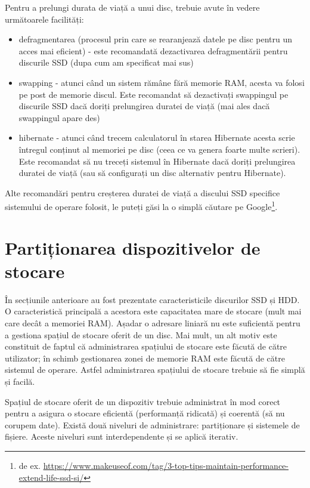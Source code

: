 Pentru a prelungi durata de viață a unui disc, trebuie avute în vedere următoarele facilități:

\begin{itemize}
  \item defragmentarea (procesul prin care se rearanjează datele pe disc pentru un acces mai eficient) - este recomandată dezactivarea defragmentării pentru discurile SSD (dupa cum am specificat mai sus)
  \item swapping - atunci când un sistem rămâne fără memorie RAM, acesta va folosi pe post de memorie discul.
Este recomandat să dezactivați swappingul pe discurile SSD dacă doriți prelungirea duratei de viață (mai ales dacă swappingul apare des)
  \item hibernate - atunci când trecem calculatorul în starea Hibernate acesta scrie întregul conținut al memoriei pe disc (ceea ce va genera foarte multe scrieri).
Este recomandat să nu treceți sistemul în Hibernate dacă doriți prelungirea duratei de viață (sau să configurați un disc alternativ pentru Hibernate).
\end{itemize}

Alte recomandări pentru creșterea duratei de viață a discului SSD specifice sistemului de operare folosit, le puteți găsi la o simplă căutare pe Google\footnote{de ex. \url{https://www.makeuseof.com/tag/3-top-tips-maintain-performance-extend-life-ssd-si/}}.

\section{Partiționarea dispozitivelor de stocare}
\label{sec:storage:partition}

În secțiunile anterioare au fost prezentate caracteristicile discurilor SSD și HDD.
O caracteristică principală a acestora este capacitatea mare de stocare (mult mai care decât a memoriei RAM).
Așadar o adresare liniară nu este suficientă pentru a gestiona spațiul de stocare oferit de un disc.
Mai mult, un alt motiv este constituit de faptul că administrarea spațiului de stocare este făcută de către utilizator;
în schimb gestionarea zonei de memorie RAM este făcută de către sistemul de operare.
Astfel administrarea spațiului de stocare trebuie să fie simplă și facilă.

Spațiul de stocare oferit de un dispozitiv trebuie administrat în mod corect pentru a asigura o stocare eficientă (performanță ridicată) și coerentă (să nu corupem date).
Există două niveluri de administrare: partiționare și sistemele de fișiere.
Aceste niveluri sunt interdependente și se aplică iterativ.

